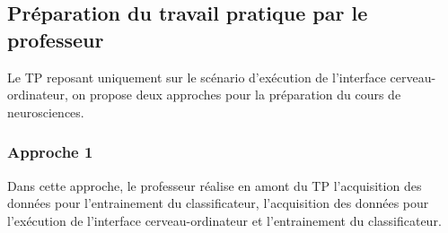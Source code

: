 \subsection{Préparation du travail pratique par le professeur}

Le TP reposant uniquement sur le scénario d'exécution de l'interface cerveau-ordinateur,  on propose deux approches pour la préparation du cours de neurosciences.

\subsubsection{Approche 1}

Dans cette approche, le professeur réalise en amont du TP l'acquisition des données pour l'entrainement du classificateur, l'acquisition des données pour l'exécution de l'interface cerveau-ordinateur et l'entrainement du classificateur.

